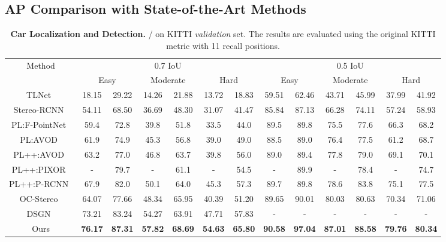 \documentclass[letterpaper, 10 pt, conference]{ieeeconf}
\begin{document}
\subsection{AP Comparison with State-of-the-Art Methods}
\begin{table*}[h!]
	\small
	\centering
	\tabcolsep=0.11cm
	\begin{tabular}{|c||c@{~/~}cc@{~/~}cc@{~/~}c||c@{~/~}cc@{~/~}cc@{~/~}c|}
		\hline
		\multirow{2}{*}{Method} & \multicolumn{6}{c||}{0.7 IoU} & \multicolumn{6}{c|}{0.5 IoU} \\
		\cline{2-13} &
		\multicolumn{2}{c}{Easy} & \multicolumn{2}{c}{Moderate} & \multicolumn{2}{c||}{Hard} &
		\multicolumn{2}{c}{Easy} & \multicolumn{2}{c}{Moderate} & \multicolumn{2}{c|}{Hard} \\ \hline
		TLNet~\cite{qin2019triangulation} & 18.15 & 29.22 & 14.26 & 21.88 & 13.72 &18.83 & 59.51 & 62.46 & 43.71& 45.99 & 37.99 & 41.92 \\
		\hline
		Stereo-RCNN~\cite{li2019stereo} & 54.11 & 68.50 & 36.69 & 48.30 & 31.07 & 41.47 & 85.84 & 87.13 & 66.28 & 74.11 & 57.24 &58.93\\
		\hline
		PL:F-PointNet~\cite{wang2019pseudo} &59.4 & 72.8 &39.8 & 51.8 & 33.5 &44.0 &89.5 & 89.8 & 75.5 & 77.6 &66.3 &68.2  \\
		\hline
		PL:AVOD~\cite{wang2019pseudo} & 61.9 & 74.9 & 45.3 & 56.8 & 39.0 & 49.0 & 88.5&89.0 & 76.4 &77.5 & 61.2 & 68.7 \\
		\hline
		PL++:AVOD~\cite{you2019pseudo} & 63.2 & 77.0 & 46.8 & 63.7 & 39.8 & 56.0 & 89.0& 89.4 &77.8 & 79.0 & 69.1 & 70.1 \\
		\hline
		PL++:PIXOR~\cite{you2019pseudo} & - & 79.7 & - & 61.1 & - & 54.5 & - & 89.9 & - & 78.4 & - &74.7\\
		\hline
		PL++:P-RCNN~\cite{you2019pseudo} & 67.9 & 82.0 & 50.1 & 64.0 & 45.3 & 57.3 & 89.7 &89.8 &78.6 & 83.8 &75.1 & 77.5\\
		\hline
		OC-Stereo~\cite{pon2019object} &64.07 &77.66 &  48.34 & 65.95 & 40.39 & 51.20 & 89.65 & 90.01 & 80.03 & 80.63 & 70.34 & 71.06 \\
		\hline
		DSGN~\cite{chen2020dsgn} &73.21 &83.24 & 54.27 & 63.91 & 47.71 & 57.83 & - & - & - & - & - & - \\
		\hline
		Ours & \textbf{76.17} & \textbf{87.31} & \textbf{57.82} & \textbf{68.69} & \textbf{54.63} & \textbf{65.80} & \textbf{90.58}  & \textbf{97.04} & \textbf{87.01} & \textbf{88.58} & \textbf{79.76} & \textbf{80.34} \\
		\hline
	\end{tabular}
	\caption{\textbf{Car Localization and Detection.}  /  on KITTI \emph{validation} set. The results are evaluated using the original KITTI metric with 11 recall positions.}
	\label{tab:kitti_val_cars}
\end{table*}
\end{document}
